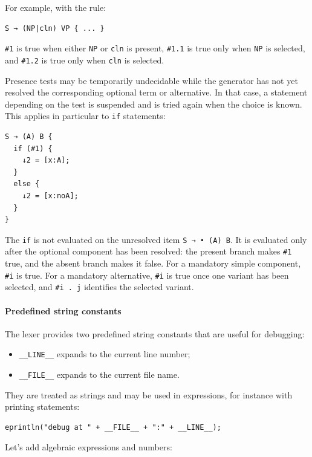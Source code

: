 \documentclass[11pt]{article}
\begin{document}
\begin{itemize}
For example, with the rule:

\begin{lstlisting}[numbers=none]
S → (NP|cln) VP { ... }
\end{lstlisting}

\verb|#1| is true when either \verb#NP# or \verb#cln# is present,
\verb|#1.1| is true only when \verb#NP# is selected, and \verb|#1.2| is true
only when \verb#cln# is selected.

Presence tests may be temporarily undecidable while the generator has not yet
resolved the corresponding optional term or alternative. In that case, a
statement depending on the test is suspended and is tried again when the
choice is known. This applies in particular to \verb#if# statements:

\begin{lstlisting}[numbers=none]
S → (A) B {
  if (#1) {
    ↓2 = [x:A];
  }
  else {
    ↓2 = [x:noA];
  }
}
\end{lstlisting}

The \verb#if# is not evaluated on the unresolved item \verb#S → • (A) B#.
It is evaluated only after the optional component has been resolved: the
present branch makes \verb|#1| true, and the absent branch makes it false.
For a mandatory simple component, \verb|#i| is true. For a mandatory
alternative, \verb|#i| is true once one variant has been selected, and
\verb|#i . j| identifies the selected variant.

\paragraph{Predefined string constants}

The lexer provides two predefined string constants that are useful for
debugging:

\begin{itemize}
	\item \verb#__LINE__# expands to the current line number;
	\item \verb#__FILE__# expands to the current file name.
\end{itemize}

They are treated as strings and may be used in expressions, for instance
with printing statements:

\begin{lstlisting}[numbers=none]
eprintln("debug at " + __FILE__ + ":" + __LINE__);
\end{lstlisting}

Let's add algebraic expressions and numbers:


\end{itemize}
\end{document}
